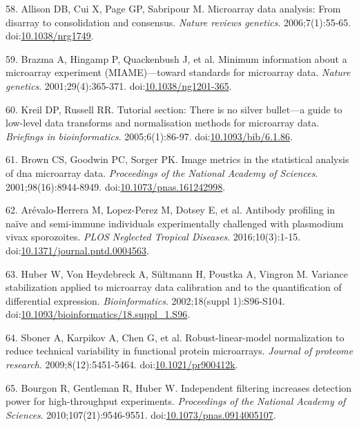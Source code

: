 \documentclass[]{article}
\begin{document}
\hypertarget{ref-allison2006}{}
58. Allison DB, Cui X, Page GP, Sabripour M. Microarray data analysis:
From disarray to consolidation and consensus. \emph{Nature reviews
genetics}. 2006;7(1):55-65.
doi:\href{https://doi.org/10.1038/nrg1749}{10.1038/nrg1749}.

\hypertarget{ref-brazma2001}{}
59. Brazma A, Hingamp P, Quackenbush J, et al. Minimum information about
a microarray experiment (MIAME)---toward standards for microarray data.
\emph{Nature genetics}. 2001;29(4):365-371.
doi:\href{https://doi.org/10.1038/ng1201-365}{10.1038/ng1201-365}.

\hypertarget{ref-kreil2005bullet}{}
60. Kreil DP, Russell RR. Tutorial section: There is no silver
bullet---a guide to low-level data transforms and normalisation methods
for microarray data. \emph{Briefings in bioinformatics}.
2005;6(1):86-97.
doi:\href{https://doi.org/10.1093/bib/6.1.86}{10.1093/bib/6.1.86}.

\hypertarget{ref-brown2001image}{}
61. Brown CS, Goodwin PC, Sorger PK. Image metrics in the statistical
analysis of dna microarray data. \emph{Proceedings of the National
Academy of Sciences}. 2001;98(16):8944-8949.
doi:\href{https://doi.org/10.1073/pnas.161242998}{10.1073/pnas.161242998}.

\hypertarget{ref-arevalo2016}{}
62. Arévalo-Herrera M, Lopez-Perez M, Dotsey E, et al. Antibody
profiling in naïve and semi-immune individuals experimentally challenged
with plasmodium vivax sporozoites. \emph{PLOS Neglected Tropical
Diseases}. 2016;10(3):1-15.
doi:\href{https://doi.org/10.1371/journal.pntd.0004563}{10.1371/journal.pntd.0004563}.

\hypertarget{ref-huber2002vsn}{}
63. Huber W, Von Heydebreck A, Sültmann H, Poustka A, Vingron M.
Variance stabilization applied to microarray data calibration and to the
quantification of differential expression. \emph{Bioinformatics}.
2002;18(suppl 1):S96-S104.
doi:\href{https://doi.org/10.1093/bioinformatics/18.suppl_1.S96}{10.1093/bioinformatics/18.suppl\_1.S96}.

\hypertarget{ref-sboner2009rlm}{}
64. Sboner A, Karpikov A, Chen G, et al. Robust-linear-model
normalization to reduce technical variability in functional protein
microarrays. \emph{Journal of proteome research}. 2009;8(12):5451-5464.
doi:\href{https://doi.org/10.1021/pr900412k}{10.1021/pr900412k}.

\hypertarget{ref-bourgon2010filter}{}
65. Bourgon R, Gentleman R, Huber W. Independent filtering increases
detection power for high-throughput experiments. \emph{Proceedings of
the National Academy of Sciences}. 2010;107(21):9546-9551.
doi:\href{https://doi.org/10.1073/pnas.0914005107}{10.1073/pnas.0914005107}.
\end{document}
